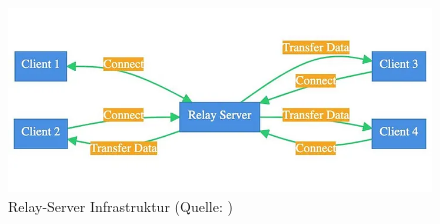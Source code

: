 \begin{figure}[ht]
\centering
\includegraphics[width=1\linewidth]{content/pictures/0_o7LJU1ImxPHIM5Ej.png}
\caption{Relay-Server Infrastruktur (Quelle: \cite{mygames_unity_2024})}
\label{fig:relay-server}
\end{figure}


